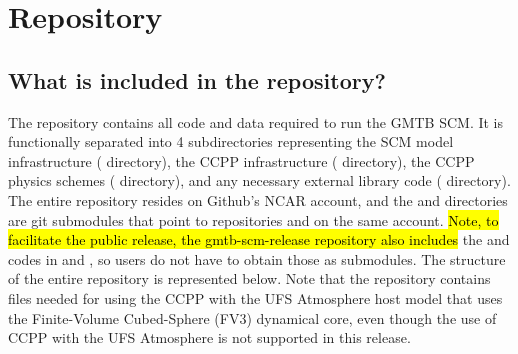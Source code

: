 \chapter{Repository}
\label{chapter: repository}

\section{What is included in the repository?}
The repository contains all code and data required to run the GMTB SCM. It is functionally separated into 4 subdirectories representing the SCM model infrastructure ( directory), the CCPP infrastructure ( directory), the CCPP physics schemes ( directory), and any necessary external library code ( directory). The entire  repository resides on Github's NCAR account, and the  and  directories are git submodules that point to repositories  and  on the same account. \hl{Note, to facilitate the public release, the gmtb-scm-release repository also includes} the  and  codes in  and , so users do not have to obtain those as submodules. The structure of the entire repository is represented below. Note that the  repository contains files needed for using the CCPP with the UFS Atmosphere host model that uses the Finite-Volume Cubed-Sphere (FV3) dynamical core, even though the use of CCPP with the UFS Atmosphere is not supported in this release.


